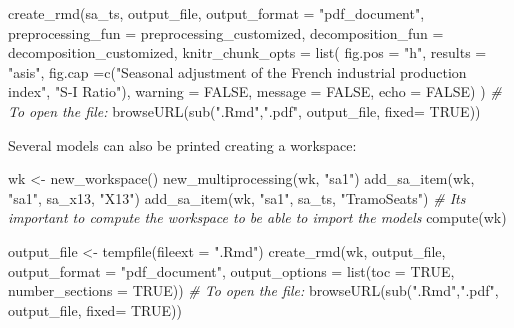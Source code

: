 \documentclass[
]{article}
\newenvironment{Shaded}{\begin{snugshade}}{\end{snugshade}}
\newcommand{\AttributeTok}[1]{\textcolor[rgb]{0.77,0.63,0.00}{#1}}
\newcommand{\CommentTok}[1]{\textcolor[rgb]{0.56,0.35,0.01}{\textit{#1}}}
\newcommand{\ConstantTok}[1]{\textcolor[rgb]{0.00,0.00,0.00}{#1}}
\newcommand{\FunctionTok}[1]{\textcolor[rgb]{0.00,0.00,0.00}{#1}}
\newcommand{\NormalTok}[1]{#1}
\newcommand{\OtherTok}[1]{\textcolor[rgb]{0.56,0.35,0.01}{#1}}
\newcommand{\StringTok}[1]{\textcolor[rgb]{0.31,0.60,0.02}{#1}}
\begin{document}
\begin{Shaded}
\begin{Highlighting}[]
\FunctionTok{create\_rmd}\NormalTok{(sa\_ts, output\_file, }\AttributeTok{output\_format =} \StringTok{"pdf\_document"}\NormalTok{,}
           \AttributeTok{preprocessing\_fun =}\NormalTok{ preprocessing\_customized,}
           \AttributeTok{decomposition\_fun =}\NormalTok{ decomposition\_customized,}
           \AttributeTok{knitr\_chunk\_opts =} \FunctionTok{list}\NormalTok{(}
             \AttributeTok{fig.pos =} \StringTok{"h"}\NormalTok{, }\AttributeTok{results =} \StringTok{"asis"}\NormalTok{, }
             \AttributeTok{fig.cap =}\FunctionTok{c}\NormalTok{(}\StringTok{"Seasonal adjustment of the French industrial production index"}\NormalTok{,}
                        \StringTok{"S{-}I Ratio"}\NormalTok{),}
             \AttributeTok{warning =} \ConstantTok{FALSE}\NormalTok{, }\AttributeTok{message =} \ConstantTok{FALSE}\NormalTok{, }\AttributeTok{echo =} \ConstantTok{FALSE}\NormalTok{)}
\NormalTok{           )}
\CommentTok{\# To open the file:}
\FunctionTok{browseURL}\NormalTok{(}\FunctionTok{sub}\NormalTok{(}\StringTok{".Rmd"}\NormalTok{,}\StringTok{".pdf"}\NormalTok{, output\_file, }\AttributeTok{fixed=} \ConstantTok{TRUE}\NormalTok{))}
\end{Highlighting}
\end{Shaded}

Several models can also be printed creating a workspace:

\begin{Shaded}
\begin{Highlighting}[]
\NormalTok{wk }\OtherTok{\textless{}{-}} \FunctionTok{new\_workspace}\NormalTok{()}
\FunctionTok{new\_multiprocessing}\NormalTok{(wk, }\StringTok{"sa1"}\NormalTok{)}
\FunctionTok{add\_sa\_item}\NormalTok{(wk, }\StringTok{"sa1"}\NormalTok{, sa\_x13, }\StringTok{"X13"}\NormalTok{)}
\FunctionTok{add\_sa\_item}\NormalTok{(wk, }\StringTok{"sa1"}\NormalTok{, sa\_ts, }\StringTok{"TramoSeats"}\NormalTok{)}
\CommentTok{\# It\textquotesingle{}s important to compute the workspace to be able to import the models}
\FunctionTok{compute}\NormalTok{(wk)}

\NormalTok{output\_file }\OtherTok{\textless{}{-}} \FunctionTok{tempfile}\NormalTok{(}\AttributeTok{fileext =} \StringTok{".Rmd"}\NormalTok{)}
\FunctionTok{create\_rmd}\NormalTok{(wk, output\_file, }\AttributeTok{output\_format =} \StringTok{"pdf\_document"}\NormalTok{,}
           \AttributeTok{output\_options =} \FunctionTok{list}\NormalTok{(}\AttributeTok{toc =} \ConstantTok{TRUE}\NormalTok{,}
                                 \AttributeTok{number\_sections =} \ConstantTok{TRUE}\NormalTok{))}
\CommentTok{\# To open the file:}
\FunctionTok{browseURL}\NormalTok{(}\FunctionTok{sub}\NormalTok{(}\StringTok{".Rmd"}\NormalTok{,}\StringTok{".pdf"}\NormalTok{, output\_file, }\AttributeTok{fixed=} \ConstantTok{TRUE}\NormalTok{))}
\end{Highlighting}
\end{Shaded}
\end{document}
